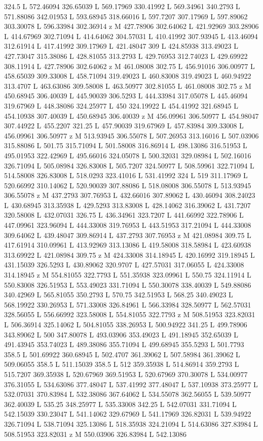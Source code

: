 {\begin{scope}[local bounding box=bb]
{324.5 L 572.46094 326.65039 L 569.17969 330.41992 L 569.34961 340.2793 L 571.88086 342.01953 L 593.68945 318.66016 L 597.7207 307.17969 L 597.89062 303.30078 L 596.33984 302.36914 z M 427.78906 302.64062 L 421.92969 303.28906 L 414.67969 302.71094 L 414.64062 304.57031 L 410.41992 307.93945 L 413.46094 312.61914 L 417.41992 309.17969 L 421.48047 309 L 424.85938 313.49023 L 427.73047 315.38086 L 428.81055 313.2793 L 429.76953 312.74023 L 429.69922 308.11914 L 427.78906 302.64062 z M 461.08008 302.75 L 456.91016 306.00977 L 458.65039 309.33008 L 458.71094 319.49023 L 460.83008 319.49023 L 460.94922 313.4707 L 463.63086 309.58008 L 463.50977 302.81055 L 461.08008 302.75 z M 450.68945 306.40039 L 445.90039 306.5293 L 444.33984 317.05078 L 445.46094 319.67969 L 448.38086 324.25977 L 450 324.19922 L 454.41992 321.68945 L 454.10938 307.40039 L 450.68945 306.40039 z M 456.09961 306.50977 L 454.98047 307.44922 L 455.2207 321.25 L 457.90039 319.67969 L 457.83984 309.33008 L 456.09961 306.50977 z M 513.93945 306.55078 L 507.26953 313.16016 L 507.03906 315.88086 L 501.75 315.71094 L 501.58008 316.86914 L 498.13086 316.51953 L 495.01953 322.42969 L 495.66016 324.05078 L 500.32031 329.08984 L 502.16016 326.71094 L 505.08984 326.83008 L 505.7207 324.50977 L 508.59961 322.71094 L 514.58008 326.83008 L 518.0293 323.41016 L 531.41992 324 L 519 311.17969 L 520.66992 310.14062 L 520.90039 307.88086 L 518.08008 306.55078 L 513.93945 306.55078 z M 437.2793 307.76953 L 432.66016 307.89062 L 430.46094 308.24023 L 430.68945 313.35938 L 429.5293 313.83008 L 428.14062 316.39062 L 431.7207 320.58008 L 432.07031 326.75 L 436.34961 323.7207 L 441.66992 322.78906 L 447.09961 323.96094 L 444.33008 319.76953 L 443.51953 317.21094 L 444.33008 309.64062 L 439.48047 309.86914 L 437.2793 307.76953 z M 421.08984 309.75 L 417.61914 310.09961 L 413.92969 313.13086 L 419.58008 318.58984 L 423.60938 313.69922 L 421.08984 309.75 z M 424.33008 314.18945 L 420.16992 319.18945 L 431.15039 326.5293 L 430.89062 320.9707 L 427.57031 317.06055 L 424.33008 314.18945 z M 554.81055 322.7793 L 551.35938 323.09961 L 550.75 324.11914 L 550.83008 326.51953 L 553.49023 331.71094 L 550.30078 338.40039 L 549.88086 340.42969 L 565.81055 350.2793 L 570.75 342.51953 L 568.25 340.49023 L 568.19922 330.26953 L 571.33008 326.84961 L 566.33984 328.50977 L 562.57031 328.56055 L 556.66992 323.58008 L 554.81055 322.7793 z M 508.51953 323.82031 L 506.36914 325.14062 L 504.81055 338.26953 L 500.94922 341.25 L 499.78906 343.89062 L 500 347.80078 L 493.03906 353.49023 L 491.18945 352.65039 L 491.43945 353.74023 L 489.38086 355.71094 L 499.68945 355.5293 L 501.7793 358.5 L 501.69922 360.68945 L 502.4707 361.39062 L 507.58984 361.39062 L 509.06055 358.5 L 511.15039 358.5 L 512 359.35938 L 514.86914 359.2793 L 515.7207 369.35938 L 520.67969 369.51953 L 520.67969 370.30078 L 534.00977 376.31055 L 534.63086 377.48047 L 537.41992 377.48047 L 537.10938 373.25977 L 532.07031 370.83984 L 532.38086 367.64062 L 534.55078 362.56055 L 539.50977 362.40039 L 535.25 348.25977 L 535.33008 342.25 L 542.07031 331.71094 L 542.15039 330.23047 L 541.14062 329.67969 L 541.17969 326.82031 L 539.94922 326.71094 L 538.71094 325.13086 L 518.35938 324.21094 L 514.63086 327.83984 L 508.51953 323.82031 z M 550.03906 326.83984 L 542.13086 }
\end{scope}}
